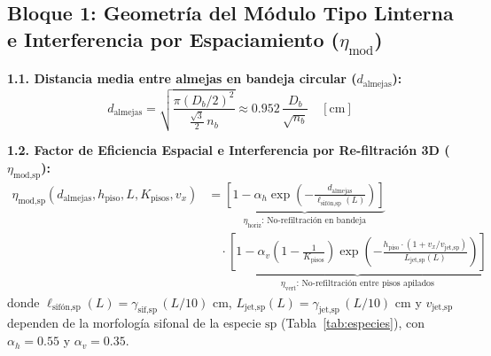 \documentclass[11pt,letterpaper]{article}
\begin{document}
\subsection{Bloque 1: Geometría del Módulo Tipo Linterna e Interferencia por Espaciamiento ($\eta_{\text{mod}}$)}

\begin{formulabox}
\textbf{1.1. Distancia media entre almejas en bandeja circular ($d_{\text{almejas}}$):}
\begin{equation}
d_{\text{almejas}} = \sqrt{\frac{\pi \left(D_b / 2\right)^2}{\frac{\sqrt{3}}{2}\, n_b}} \approx 0.952 \, \frac{D_b}{\sqrt{n_b}} \quad [\text{cm}]
\label{eq:dalmejas}
\end{equation}

\textbf{1.2. Factor de Eficiencia Espacial e Interferencia por Re-filtración 3D ($\eta_{\text{mod,sp}}$):}
\begin{equation}
\begin{aligned}
\eta_{\text{mod,sp}}\!\left(d_{\text{almejas}}, h_{\text{piso}}, L, K_{\text{pisos}}, v_x\right) &= \underbrace{\left[1 - \alpha_h \exp\!\left(-\frac{d_{\text{almejas}}}{\ell_{\text{sifón,sp}}(L)}\right)\right]}_{\eta_{\text{horiz}}\text{: No-refiltración en bandeja}} \\
&\quad \cdot \underbrace{\left[1 - \alpha_v \left(1 - \frac{1}{K_{\text{pisos}}}\right) \exp\!\left(-\frac{h_{\text{piso}} \cdot \left(1 + v_x / v_{\text{jet,sp}}\right)}{L_{\text{jet,sp}}(L)}\right)\right]}_{\eta_{\text{vert}}\text{: No-refiltración entre pisos apilados}}
\end{aligned}
\label{eq:etamod}
\end{equation}
donde $\ell_{\text{sifón,sp}}(L) = \gamma_{\text{sif,sp}}\,(L/10)\text{ cm}$, $L_{\text{jet,sp}}(L) = \gamma_{\text{jet,sp}}\,(L/10)\text{ cm}$ y $v_{\text{jet,sp}}$ dependen de la morfología sifonal de la especie $\text{sp}$ (Tabla~\ref{tab:especies}), con $\alpha_h = 0.55$ y $\alpha_v = 0.35$.
\end{formulabox}
\end{document}
